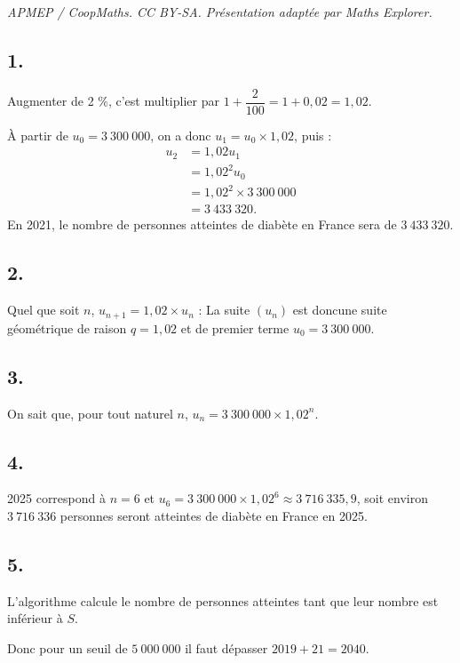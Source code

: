 \documentclass[10pt]{article}
\begin{document}
\noindent\textit{APMEP / CoopMaths. CC BY-SA. Présentation adaptée par Maths Explorer.}\par\medskip
\subsection*{1.}

Augmenter de 2 \%, c'est multiplier par \( 1 + \dfrac{2}{100} = 1 + 0{,}02 = 1{,}02 \).

À partir de \(u_0 = 3\ 300\ 000\), on a donc \(u_1 = u_0 \times 1{,}02\), puis :
\begin{align*}
u_2 &= 1{,}02 u_1 \\
&= 1{,}02^2 u_0 \\
&= 1{,}02^2 \times 3\ 300\ 000 \\
&= 3\ 433\ 320.
\end{align*}
En 2021, le nombre de personnes atteintes de diabète en France sera de \(3\ 433\ 320\).

\subsection*{2.}

Quel que soit \( n \), \( u_{n+1} = 1{,}02 \times u_n \) : La suite \( (u_n) \) est doncune suite géométrique de raison \(q = 1{,}02\) et de premier terme \( u_0 = 3\ 300\ 000 \).

\subsection*{3.}

On sait que, pour tout naturel \( n \), \( u_n = 3\ 300\ 000 \times 1{,}02^n \).

\subsection*{4.}

2025 correspond à \(n = 6\) et \(u_6 = 3\ 300\ 000 \times 1{,}02^6 \approx 3\ 716\ 335{,}9\), soit environ \(3\ 716\ 336\) personnes seront atteintes de diabète en France en 2025.

\subsection*{5.}

L'algorithme calcule le nombre de personnes atteintes tant que leur nombre est inférieur à \(S\).

Donc pour un seuil de \(5\ 000\ 000\) il faut dépasser \(2019 + 21 = 2040\).
\end{document}
